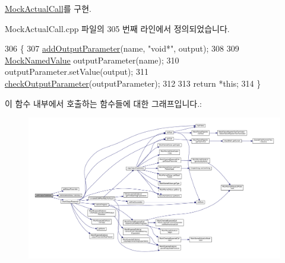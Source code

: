 \hyperlink{class_mock_actual_call_a1447eda6e2bb53a711a6873b007ccd0a}{Mock\+Actual\+Call}를 구현.



Mock\+Actual\+Call.\+cpp 파일의 305 번째 라인에서 정의되었습니다.


\begin{DoxyCode}
306 \{
307     \hyperlink{class_mock_checked_actual_call_a3e455a0520e2de1fdeec6cce0fe0ecf9}{addOutputParameter}(name, \textcolor{stringliteral}{"void*"}, output);
308 
309     \hyperlink{class_mock_named_value}{MockNamedValue} outputParameter(name);
310     outputParameter.setValue(output);
311     \hyperlink{class_mock_checked_actual_call_ae5bb17583112fdf624ab592bf40d39c1}{checkOutputParameter}(outputParameter);
312 
313     \textcolor{keywordflow}{return} *\textcolor{keyword}{this};
314 \}
\end{DoxyCode}


이 함수 내부에서 호출하는 함수들에 대한 그래프입니다.\+:
\nopagebreak
\begin{figure}[H]
\begin{center}
\leavevmode
\includegraphics[width=350pt]{class_mock_checked_actual_call_a37088c117215f5ff1146cc68ec6db6ce_cgraph}
\end{center}
\end{figure}


